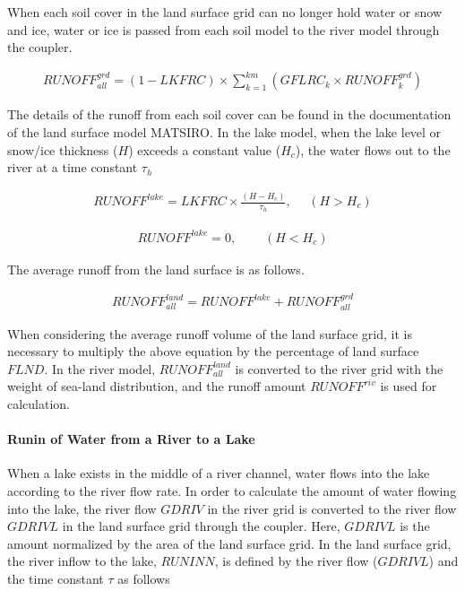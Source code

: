 When each soil cover in the land surface grid can no longer hold water or snow and ice, water or ice is passed from each soil model to the river model through the coupler.

\begin{eqnarray} RUNOFF^{grd}_{all} =
    (1-LKFRC) \times \sum_{k=1}^{km}(GFLRC_{k} \times RUNOFF^{grd}_{k}) \end{eqnarray}

The details of the runoff from each soil cover can be found in the documentation of the land surface model MATSIRO. In the lake model, when the lake level or snow/ice thickness (\(H\)) exceeds a
constant value (\(H_c\)), the water flows out to the river at a time constant \(\tau_h\)

\begin{eqnarray} RUNOFF^{lake} = LKFRC \times \frac{(H-H_c)}{\tau_h},~~~~~~ (H>H_c) \end{eqnarray}

\begin{eqnarray} RUNOFF^{lake} = 0,~~~~~~~~~~ (H<H_c) \end{eqnarray}

The average runoff from the land surface is as follows.

\begin{eqnarray} RUNOFF^{land}_{all} = RUNOFF^{lake} + RUNOFF^{grd}_{all} \end{eqnarray}

When considering the average runoff volume of the land surface grid, it is necessary to multiply the above equation by the percentage of land surface \(FLND\). In the river model,
\(RUNOFF^{land}_{all}\) is converted to the river grid with the weight of sea-land distribution, and the runoff amount \(RUNOFF^{riv}\) is used for calculation.

\hypertarget{runin-of-water-from-a-river-to-a-lake}{%
\paragraph{Runin of Water from a River to a Lake}\label{runin-of-water-from-a-river-to-a-lake}}

When a lake exists in the middle of a river channel, water flows into the lake according to the river flow rate. In order to calculate the amount of water flowing into the lake, the river flow
\(GDRIV\) in the river grid is converted to the river flow \(GDRIVL\) in the land surface grid through the coupler. Here, \(GDRIVL\) is the amount normalized by the area of the land surface grid. In
the land surface grid, the river inflow to the lake, \(RUNINN\), is defined by the river flow (\(GDRIVL\)) and the time constant \(\tau\) as follows

